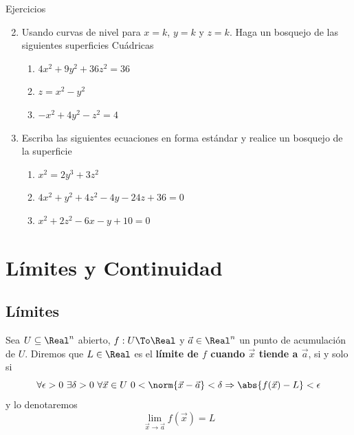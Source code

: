 \begin{frame}{Ejercicios}
  \begin{enumerate}
    \setcounter{enumi}{1}
    \item Usando curvas de nivel para $x=k$, $y=k$ y $z=k$. Haga un bosquejo de las siguientes superficies Cuádricas\\[0.25cm]
      \begin{enumerate}
        \item $4x^2+9y^2+36z^2=36$
        \item $z=x^2-y^2$
        \item $-x^2+4y^2-z^2=4$
      \end{enumerate}
    \vspace{0.5cm}
    \item Escriba las siguientes ecuaciones en forma estándar y realice un bosquejo de la superficie\\[0.25cm]
      \begin{enumerate}
        \item $x^2=2y^3+3z^2$
        \item $4x^2+y^2+4z^2-4y-24z+36=0$
        \item $x^2+2z^2-6x-y+10=0$
      \end{enumerate}
  \end{enumerate}
\end{frame}

\section{Límites y Continuidad}
\begin{frame}
\sectionpage
\end{frame}

\begin{frame}
\tableofcontents[currentsection]
\end{frame}

\subsection{Límites}
\begin{frame}
\subsectionpage
\end{frame}


\begin{frame}{}
  \begin{defn}
    Sea $U\subseteq\Real^n$ abierto, $f:U\To\Real$ y $\vec{a}\in\Real^n$ un punto de acumulación de $U$. Diremos que $L\in\Real$ es el \textbf{límite de $f$ cuando $\vec{x}$ tiende a $\vec{a}$}, si y solo si
    $$\forall\epsilon>0\ \exists\delta>0\ \forall\vec{x}\in U\ 0<\norm{\vec{x}-\vec{a}}<\delta\Rightarrow\abs{f(\vec{x})-L}<\epsilon$$
    y lo denotaremos
    $$\lim_{\vec{x}\to\vec{a}}f(\vec{x})=L$$
  \end{defn}
\end{frame}

